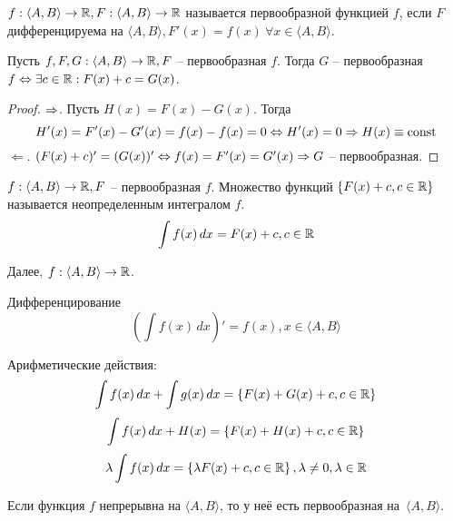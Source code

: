 



\Header

\BeginConspect


\begin{Def}
    $f : \langle A, B\rangle \to \mathbb{R}, F : \langle A, B\rangle \to \mathbb{R}$ называется первообразной функцией $f$, если $F$ дифференцируема на $\langle A, B\rangle, F'(x) = f(x) \ \forall x \in \langle A, B\rangle$.
\end{Def}

\begin{Thm}
    Пусть $f, F, G : \langle A, B\rangle \to \mathbb{R}, F$ -- первообразная $f$. Тогда
    $G$ -- первообразная $f \Leftrightarrow \exists c \in \mathbb{R} : F(x) + c = G(x)$.
\end{Thm}

\begin{proof}
	$\Rightarrow$.  
    Пусть $H(x) = F(x) - G(x)$. Тогда
	\[H'(x) = F'(x) - G'(x) = f(x) - f(x) = 0 \Leftrightarrow H'(x) = 0 \Rightarrow H(x) \equiv \operatorname{const}\]
    $\Leftarrow$. $(F(x) + c)' = (G(x))' \Leftrightarrow f(x) = F'(x) = G'(x) \Rightarrow G$ -- первообразная.  
\end{proof}

\begin{Def}
    $f : \langle A, B\rangle \to \mathbb{R}, F$ -- первообразная $f$. Множество функций 
    $\{F(x) + c, c \in \mathbb{R}\}$ называется неопределенным интегралом $f$.
    \[\int f(x) \,dx = F(x) + c, c \in \mathbb{R} \] 
\end{Def}

Далее, $f : \langle A, B\rangle \to \mathbb{R}$. 

\begin{MyList}
	\item Дифференцирование
	\[\left(\int f(x) \,dx\right)' = f(x), x \in \langle A, B\rangle\]

	\item Арифметические действия: 
	\[\int f(x) \,dx + \int g(x) \,dx = \left\{F(x) + G(x) + c, c \in \mathbb{R}\right\}\]
	\[\int f(x) \,dx + H(x) = \left\{F(x) + H(x) + c, c \in \mathbb{R}\right\}\]
	\[\lambda \int f(x) \,dx = \left\{\lambda F(x) + c, c \in \mathbb{R}\right\}, \lambda \neq 0, \lambda \in \mathbb{R}\]
\end{MyList}

\begin{Prop}
	Если функция $f$ непрерывна на $\langle A, B\rangle$, то у неё есть первообразная на~$\langle A, B\rangle$.
\end{Prop}

